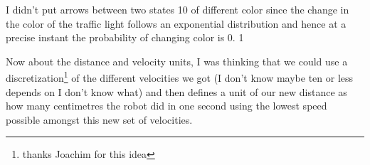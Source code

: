\documentclass{article}
\begin{document}
I didn't put arrows between two states 10 of different color since the change in the color of the traffic light follows an exponential distribution and hence at a precise instant the probability of changing color is 0.  1
    
    
    
    Now about the distance and velocity units, I was thinking that we could use a discretization\footnote{thanks Joachim for this idea} of the different velocities we got (I don't know maybe ten or less depends on I don't know what) and then defines a unit of our new distance as how many centimetres the robot did in one second using the lowest speed possible amongst this new set of velocities.
    
    
    
    
\end{document}
